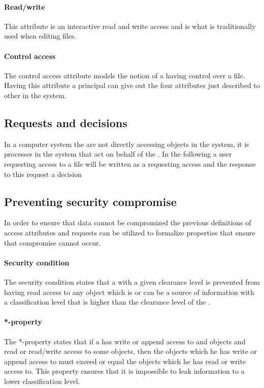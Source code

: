 \paragraph{Read/write}
This attribute is an interactive read and write access and is what is traditionally used when editing files.

\paragraph{Control access}
The control access attribute models the notion of a \principal{} having control over a file.
Having this attribute a principal{} can give out the four attributes just described to other \principals{} in the system.

\subsection{Requests and decisions}
In a computer system the \principals{} are not directly accessing objects in the system, it is processes in the system that act on behalf of the \principal{}.
In the following a user requesting access to a file will be written as a \principal{} requesting access and the response to this request a decision

\subsection{Preventing security compromise}
In order to ensure that data cannot be compromized the previous definitions of access attributes and requests can be utilized to formalize properties that ensure that compromise cannot occur.

\paragraph{Security condition}
The security condition states that a \principal{} with a given clearance level is prevented from having read access to any object which is or can be a source of information with a classification level that is higher than the clearance level of the \principal{}.

\paragraph{*-property}
The *-property states that if a \principal{} has write or append access to and objects and read or read/write access to some objects, then the objects which he has write or append access to must exceed or equal the objects which he has read or write access to.
This property ensures that it is impossible to leak information to a lower classification level.

